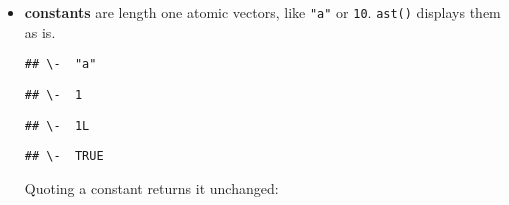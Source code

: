\begin{itemize}
\item
  \textbf{constants} are length one atomic vectors, like \texttt{"a"} or
  \texttt{10}. \texttt{ast()} displays them as is. 

\begin{Shaded}
\begin{Highlighting}[]
\NormalTok{(}\NormalTok{)}
\end{Highlighting}
\end{Shaded}

\begin{verbatim}
## \-  "a"
\end{verbatim}

\begin{Shaded}
\begin{Highlighting}[]
\NormalTok{(}\NormalTok{)}
\end{Highlighting}
\end{Shaded}

\begin{verbatim}
## \-  1
\end{verbatim}

\begin{Shaded}
\begin{Highlighting}[]
\end{Highlighting}
\end{Shaded}

\begin{verbatim}
## \-  1L
\end{verbatim}

\begin{Shaded}
\begin{Highlighting}[]
\NormalTok{(}\NormalTok{)}
\end{Highlighting}
\end{Shaded}

\begin{verbatim}
## \-  TRUE
\end{verbatim}

  Quoting a constant returns it unchanged:

\begin{Shaded}
\begin{Highlighting}[]
\NormalTok{(}\NormalTok{, }\NormalTok{(}\NormalTok{))}
\end{Highlighting}
\end{Shaded}


\end{itemize}
